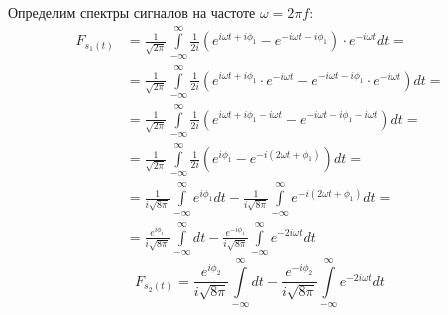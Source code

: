 \documentclass[fleqn,10pt,a4paper]{article}
\begin{document}
Определим спектры сигналов на частоте $\omega=2\pi{}f$:
\begin{equation*}
	\begin{aligned}
		F_{s_1(t)} &= \frac{1}{\sqrt{2\pi}}\int\limits_{-\infty}^\infty
	                  \frac{1}{2i}\left(e^{i\omega{}t+i\phi_1}-e^{-i\omega{}t-i\phi_1}\right)\cdot{}e^{-i\omega{}t}dt=\\
	               &= \frac{1}{\sqrt{2\pi}}\int\limits_{-\infty}^\infty
	                  \frac{1}{2i}\left(e^{i\omega{}t+i\phi_1}\cdot{}e^{-i\omega{}t}-e^{-i\omega{}t-i\phi_1}\cdot{}e^{-i\omega{}t}\right)dt=\\
	               &= \frac{1}{\sqrt{2\pi}}\int\limits_{-\infty}^\infty
	                  \frac{1}{2i}\left(e^{i\omega{}t+i\phi_1-i\omega{}t}-e^{-i\omega{}t-i\phi_1-i\omega{}t}\right)dt=\\
	               &= \frac{1}{\sqrt{2\pi}}\int\limits_{-\infty}^\infty
	                  \frac{1}{2i}\left(e^{i\phi_1}-e^{-i(2\omega{}t+\phi_1)}\right)dt=\\
	               &= \frac{1}{i\sqrt{8\pi}}\int\limits_{-\infty}^\infty
	                  e^{i\phi_1}dt -
	                  \frac{1}{i\sqrt{8\pi}}\int\limits_{-\infty}^\infty
	                  e^{-i(2\omega{}t+\phi_1)}dt=\\
	               &= \frac{e^{i\phi_1}}{i\sqrt{8\pi}}\int\limits_{-\infty}^\infty
	                  dt -
	                  \frac{e^{-i\phi_1}}{i\sqrt{8\pi}}\int\limits_{-\infty}^\infty
	                  e^{-2i\omega{}t}dt
	\end{aligned}
\end{equation*}
\begin{equation*}
	F_{s_2(t)} = \frac{e^{i\phi_2}}{i\sqrt{8\pi}}\int\limits_{-\infty}^\infty
                  dt -
                  \frac{e^{-i\phi_2}}{i\sqrt{8\pi}}\int\limits_{-\infty}^\infty
                  e^{-2i\omega{}t}dt
\end{equation*}
\end{document}
